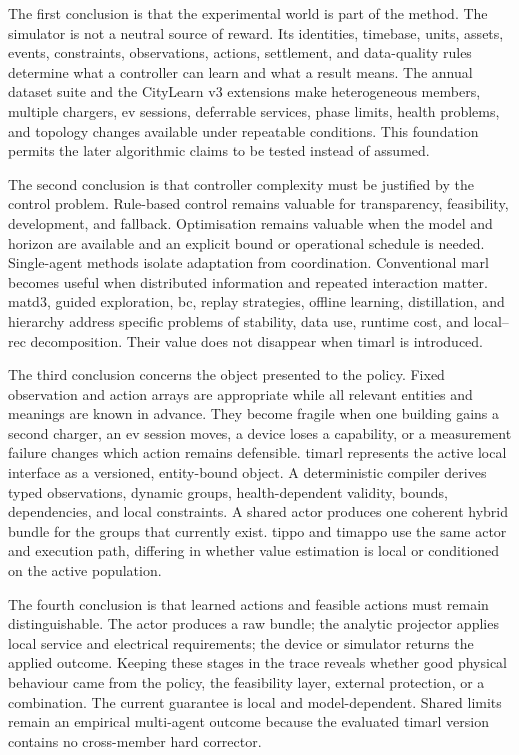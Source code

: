 The first conclusion is that the experimental world is part of the method. The simulator is not a neutral source of reward. Its identities, timebase, units, assets, events, constraints, observations, actions, settlement, and data-quality rules determine what a controller can learn and what a result means. The annual dataset suite and the CityLearn v3 extensions make heterogeneous members, multiple chargers, \gls{ev} sessions, deferrable services, phase limits, health problems, and topology changes available under repeatable conditions. This foundation permits the later algorithmic claims to be tested instead of assumed.

The second conclusion is that controller complexity must be justified by the control problem. Rule-based control remains valuable for transparency, feasibility, development, and fallback. Optimisation remains valuable when the model and horizon are available and an explicit bound or operational schedule is needed. Single-agent methods isolate adaptation from coordination. Conventional \gls{marl} becomes useful when distributed information and repeated interaction matter. \gls{matd3}, guided exploration, \gls{bc}, replay strategies, offline learning, distillation, and hierarchy address specific problems of stability, data use, runtime cost, and local--\gls{rec} decomposition. Their value does not disappear when \gls{timarl} is introduced.

The third conclusion concerns the object presented to the policy. Fixed observation and action arrays are appropriate while all relevant entities and meanings are known in advance. They become fragile when one building gains a second charger, an \gls{ev} session moves, a device loses a capability, or a measurement failure changes which action remains defensible. \gls{timarl} represents the active local interface as a versioned, entity-bound object. A deterministic compiler derives typed observations, dynamic groups, health-dependent validity, bounds, dependencies, and local constraints. A shared actor produces one coherent hybrid bundle for the groups that currently exist. \gls{tippo} and \gls{timappo} use the same actor and execution path, differing in whether value estimation is local or conditioned on the active population.

The fourth conclusion is that learned actions and feasible actions must remain distinguishable. The actor produces a raw bundle; the analytic projector applies local service and electrical requirements; the device or simulator returns the applied outcome. Keeping these stages in the trace reveals whether good physical behaviour came from the policy, the feasibility layer, external protection, or a combination. The current guarantee is local and model-dependent. Shared limits remain an empirical multi-agent outcome because the evaluated \gls{timarl} version contains no cross-member hard corrector.


